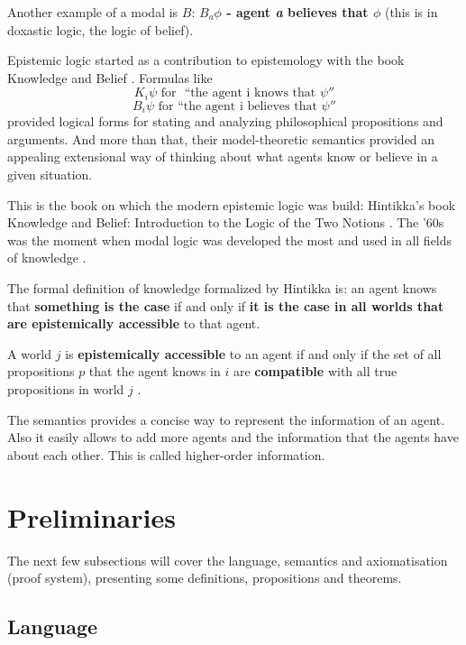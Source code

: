 \documentclass[12pt]{article}
\numberwithin{equation}{section}
\theoremstyle{definition}
\theoremstyle{definition}
\theoremstyle{remark}
\begin{document}
Another example of a modal is $B$: \textbf{$B_a\phi$ - agent \textit{a} believes that $\phi$} (this is in doxastic logic, the logic of belief).

Epistemic logic started as a contribution to epistemology with the book Knowledge and Belief \cite{hintikka}. Formulas like
$$
K_i\psi \text{ for } \text{ ``the agent i knows that } \psi ''
$$
$$
B_i\psi \text{ for } \text{``the agent i believes that }\psi ''
$$
provided logical forms for stating and analyzing philosophical propositions and arguments. And more than that, their model-theoretic semantics provided an appealing extensional way of thinking about what agents know or believe in a given situation.
 
This is the book on which the modern epistemic logic was build: Hintikka's book Knowledge and Belief: Introduction to the Logic of the Two Notions \cite{hintikka}.
The '60s was the moment when modal logic was developed the most and used in all fields of knowledge \cite{carte}.

The formal definition of knowledge formalized by Hintikka is: an agent knows that \textbf{something is the case} if and only if \textbf{it is the case in all worlds that are epistemically accessible} to that agent. 

A world $j$ is \textbf{epistemically  accessible} to an agent if and only if the set of all propositions $p$ that the agent knows in $i$ are \textbf{compatible} with all true propositions in world $j$ \cite{hintikka}.

The semantics provides a concise way to represent the information of an agent. Also it easily allows to add more agents and the information that the agents have about each other. This is called higher-order information.

\newpage


\section{Preliminaries}

The next few subsections will cover the language, semantics and axiomatisation (proof system), presenting some definitions, propositions and theorems.



\subsection{Language}
\end{document}
